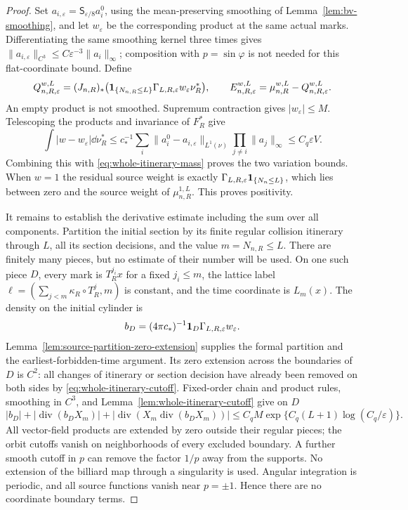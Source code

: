 \begin{proof}
Set $a_{i,\varepsilon}=\mathsf S_{\varepsilon/8}a_i^0$, using the
mean-preserving smoothing of Lemma~\ref{lem:bv-smoothing}, and let
$w_\varepsilon$ be the corresponding product at the same actual marks.
Differentiating the same smoothing kernel three times gives
$\|a_{i,\varepsilon}\|_{C^3}\le C\varepsilon^{-3}\|a_i\|_\infty$;
composition with $p=\sin\varphi$ is not needed for this flat-coordinate bound.
Define
\begin{equation}\label{eq:geometric-residual-definition}
 Q_{n,R,\varepsilon}^{w,L}=(J_{n,R})_*
 \bigl(\one_{\{N_{n,R}\le L\}}\Gamma_{L,R,\varepsilon}
                                     w_\varepsilon\nu_R^*\bigr),
 \qquad E_{n,R,\varepsilon}^{w,L}=\mu_{n,R}^{w,L}-Q_{n,R,\varepsilon}^{w,L}.
\end{equation}
An empty product is not smoothed. Supremum contraction gives
$|w_\varepsilon|\le M$. Telescoping the products and invariance of
$F_R^*$ give
\[
 \int|w-w_\varepsilon|\dd\nu_R^*
 \le c_*^{-1}\sum_i\|a_i^0-a_{i,\varepsilon}\|_{L^1(\nu)}
                        \prod_{j\ne i}\|a_j\|_\infty
 \le C_q\varepsilon V.
\]
Combining this with \eqref{eq:whole-itinerary-mass} proves the two
variation bounds. When $w=1$ the residual source weight is exactly
$\Gamma_{L,R,\varepsilon}\mathbf1_{\{N_n\le L\}}$, which lies between zero
and the source weight of $\mu^{1,L}_{n,R}$. This proves positivity.

It remains to establish the derivative estimate including the sum over
all components. Partition the initial section by its finite regular
collision itinerary through $L$, all its section decisions, and the
value $m=N_{n,R}\le L$. There are finitely many pieces, but no estimate
of their number will be used. On one such piece $D$, every mark is
$T_R^{j_i}x$ for a fixed $j_i\le m$, the lattice label
$\ell=(\sum_{j<m}\kappa_R\circ T_R^j,m)$ is constant, and the time
coordinate is $L_m(x)$. The density on the initial cylinder is
\[
 b_D=(4\pi c_*)^{-1}\mathbf1_D\Gamma_{L,R,\varepsilon}w_\varepsilon.
\]
Lemma~\ref{lem:source-partition-zero-extension} supplies the formal
partition and the earliest-forbidden-time argument. Its zero extension
across the boundaries of $D$ is $C^2$: all changes
of itinerary or section decision have already been removed on both
sides by \eqref{eq:whole-itinerary-cutoff}. Fixed-order chain and product
rules, smoothing in $C^3$, and Lemma~\ref{lem:whole-itinerary-cutoff}
give on $D$
\begin{equation}\label{eq:geometric-divergence-bound}
 |b_D|+|\operatorname{div}(b_DX_m)|+
 |\operatorname{div}(X_m\operatorname{div}(b_DX_m))|
       \le C_qM\exp\{C_q(L+1)\log(C_q/\varepsilon)\}.
\end{equation}
All vector-field products are extended by zero outside their regular
pieces; the orbit cutoffs vanish on neighborhoods of every excluded
boundary. A further smooth cutoff in $p$ can remove the factor $1/p$
away from the supports. No extension of the billiard map through a
singularity is used.
Angular integration is periodic, and all source functions vanish near
$p=\pm1$. Hence there are no coordinate boundary terms.


\end{proof}
